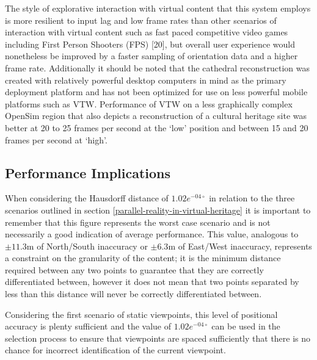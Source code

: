 The style of explorative interaction with virtual content that this system employs is more resilient to input lag and low frame rates than other scenarios of interaction with virtual content such as fast paced competitive video games including First Person Shooters (FPS) [20], but overall user experience would nonetheless be improved by a faster sampling of orientation data and a higher frame rate. Additionally it should be noted that the cathedral reconstruction was created with relatively powerful desktop computers in mind as the primary deployment platform and has not been optimized for use on less powerful mobile platforms such as VTW. Performance of VTW on a less graphically complex OpenSim region that also depicts a reconstruction of a cultural heritage site was better at 20 to 25 frames per second at the `low' position and between 15 and 20 frames per second at `high'.



\subsection{Performance Implications}

When considering the Hausdorff distance of $1.02e^{-04\circ}$ in relation to the three scenarios outlined in section \ref{parallel-reality-in-virtual-heritage} it is important to remember that this figure represents the worst case scenario and is not necessarily a good indication of average performance. This value, analogous to $\pm11.3$m of North/South inaccuracy or $\pm6.3$m of East/West inaccuracy, represents a constraint on the granularity of the content; it is the minimum distance required between any two points to guarantee that they are correctly differentiated between, however it does not mean that two points separated by less than this distance will never be correctly differentiated between.

Considering the first scenario of static viewpoints, this level of positional accuracy is plenty sufficient and the value of $1.02e^{-04\circ}$ can be used in the selection process to ensure that viewpoints are spaced sufficiently that there is no chance for incorrect identification of the current viewpoint.

